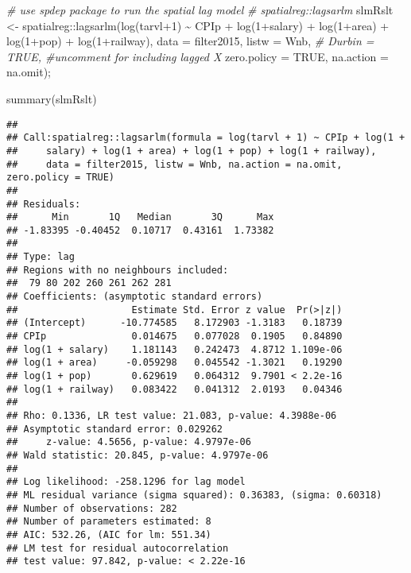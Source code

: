 \documentclass[
]{article}
\newenvironment{Shaded}{\begin{snugshade}}{\end{snugshade}}
\newcommand{\AttributeTok}[1]{\textcolor[rgb]{0.77,0.63,0.00}{#1}}
\newcommand{\CommentTok}[1]{\textcolor[rgb]{0.56,0.35,0.01}{\textit{#1}}}
\newcommand{\ConstantTok}[1]{\textcolor[rgb]{0.00,0.00,0.00}{#1}}
\newcommand{\DecValTok}[1]{\textcolor[rgb]{0.00,0.00,0.81}{#1}}
\newcommand{\FunctionTok}[1]{\textcolor[rgb]{0.00,0.00,0.00}{#1}}
\newcommand{\NormalTok}[1]{#1}
\newcommand{\OtherTok}[1]{\textcolor[rgb]{0.56,0.35,0.01}{#1}}
\newcommand{\SpecialCharTok}[1]{\textcolor[rgb]{0.00,0.00,0.00}{#1}}
\begin{document}
\begin{Shaded}
\begin{Highlighting}[]
\CommentTok{\# use spdep package to run the spatial lag model }
\CommentTok{\# spatialreg::lagsarlm }
\NormalTok{slmRslt }\OtherTok{\textless{}{-}}\NormalTok{ spatialreg}\SpecialCharTok{::}\FunctionTok{lagsarlm}\NormalTok{(}\FunctionTok{log}\NormalTok{(tarvl}\SpecialCharTok{+}\DecValTok{1}\NormalTok{) }\SpecialCharTok{\textasciitilde{}}\NormalTok{ CPIp }\SpecialCharTok{+}
                \FunctionTok{log}\NormalTok{(}\DecValTok{1}\SpecialCharTok{+}\NormalTok{salary) }\SpecialCharTok{+}
                \FunctionTok{log}\NormalTok{(}\DecValTok{1}\SpecialCharTok{+}\NormalTok{area) }\SpecialCharTok{+} \FunctionTok{log}\NormalTok{(}\DecValTok{1}\SpecialCharTok{+}\NormalTok{pop) }\SpecialCharTok{+}
                \FunctionTok{log}\NormalTok{(}\DecValTok{1}\SpecialCharTok{+}\NormalTok{railway),}
              \AttributeTok{data =}\NormalTok{ filter2015,}
              \AttributeTok{listw =}\NormalTok{ Wnb,}
              \CommentTok{\# Durbin = TRUE, \#uncomment for including lagged X}
              \AttributeTok{zero.policy =} \ConstantTok{TRUE}\NormalTok{, }
              \AttributeTok{na.action =}\NormalTok{ na.omit);}

\FunctionTok{summary}\NormalTok{(slmRslt)}
\end{Highlighting}
\end{Shaded}

\begin{verbatim}
## 
## Call:spatialreg::lagsarlm(formula = log(tarvl + 1) ~ CPIp + log(1 + 
##     salary) + log(1 + area) + log(1 + pop) + log(1 + railway), 
##     data = filter2015, listw = Wnb, na.action = na.omit, zero.policy = TRUE)
## 
## Residuals:
##      Min       1Q   Median       3Q      Max 
## -1.83395 -0.40452  0.10717  0.43161  1.73382 
## 
## Type: lag 
## Regions with no neighbours included:
##  79 80 202 260 261 262 281 
## Coefficients: (asymptotic standard errors) 
##                    Estimate Std. Error z value  Pr(>|z|)
## (Intercept)      -10.774585   8.172903 -1.3183   0.18739
## CPIp               0.014675   0.077028  0.1905   0.84890
## log(1 + salary)    1.181143   0.242473  4.8712 1.109e-06
## log(1 + area)     -0.059298   0.045542 -1.3021   0.19290
## log(1 + pop)       0.629619   0.064312  9.7901 < 2.2e-16
## log(1 + railway)   0.083422   0.041312  2.0193   0.04346
## 
## Rho: 0.1336, LR test value: 21.083, p-value: 4.3988e-06
## Asymptotic standard error: 0.029262
##     z-value: 4.5656, p-value: 4.9797e-06
## Wald statistic: 20.845, p-value: 4.9797e-06
## 
## Log likelihood: -258.1296 for lag model
## ML residual variance (sigma squared): 0.36383, (sigma: 0.60318)
## Number of observations: 282 
## Number of parameters estimated: 8 
## AIC: 532.26, (AIC for lm: 551.34)
## LM test for residual autocorrelation
## test value: 97.842, p-value: < 2.22e-16
\end{verbatim}
\end{document}

